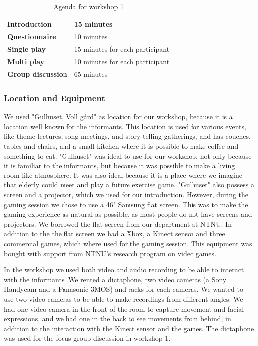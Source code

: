 \begin{table} [H]
\centering
    \begin{tabular}{|l|l|}
       \hline
       \textbf{Introduction} & 15 minutes  \\ \hline
       \textbf{Questionnaire} & 10 minutes  \\ \hline
       \textbf{Single play} & 15 minutes for each participant \\ \hline
       \textbf{Multi play} & 10 minutes for each participant \\ \hline
	   \textbf{Group discussion} & 65 minutes \\ \hline
    \end{tabular}
    \caption[Workshop 1 agenda]{Agenda for workshop 1}
    \label{tab:agendaW1}
\end{table}  

\subsubsection{Location and Equipment}
We used "Gulhuset, Voll gård" as location for our workshop, because it is a location well known for the informants. This location is used for various events, like theme lectures, song meetings, and story telling gatherings, and has couches, tables and chairs, and a small kitchen where it is possible to make coffee and something to eat. "Gulhuset" was ideal to use for our workshop, not only because it is familiar to the informants, but because it was possible to make a living room-like atmosphere. It was also ideal because it is a place where we imagine that elderly could meet and play a future exercise game. "Gulhuset" also possess a screen and a projector, which we used for our introduction. However, during the gaming session we chose to use a 46" Samsung flat screen. This was to make the gaming experience as natural as possible, as most people do not have screens and projectors. We borrowed the flat screen from our department at NTNU. In addition to the the flat screen we had a Xbox, a Kinect sensor and three commercial games, which where used for the gaming session. This equipment was bought with support from NTNU's research program on video games.   

In the workshop we used both video and audio recording to be able to interact with the informants. We rented a dictaphone, two video cameras (a Sony Handycam and a Panasonic 3MOS) and racks for each cameras. We wanted to use two video cameras to be able to make recordings from different angles. We had one video camera in the front of the room to capture movement and facial expressions, and we had one in the back to see movements from behind, in addition to the interaction with the Kinect sensor and the games. The dictaphone was used for the focus-group discussion in workshop 1.    

